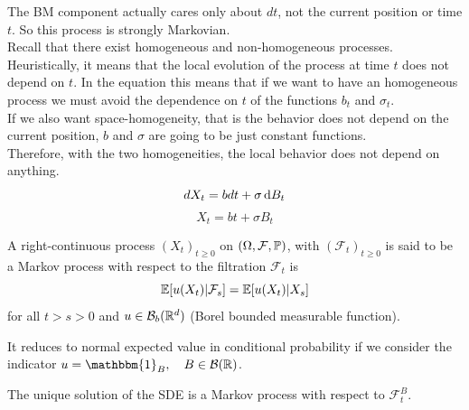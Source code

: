 The BM component actually cares only about $dt$, not the current position or time $t$. So this process is strongly Markovian. \\
Recall that there exist homogeneous and non-homogeneous processes. Heuristically, it means that the local evolution of the process at time $t$ does not depend on $t$. In the equation this means that if we want to have an homogeneous process we must avoid the dependence on $t$ of the functions $b_t$ and $\sigma_t$. \\

If we also want space-homogeneity, that is the behavior does not depend on the current position, $b$ and $\sigma$ are going to be just constant functions. \\
Therefore, with the two homogeneities, the local behavior does not depend on anything. \\
\begin{equation*}
    dX_t = b dt + \sigma \mathop{}\!\mathrm{d} B_t
\end{equation*}
\begin{equation*}
    X_t = bt + \sigma B_t
\end{equation*}
\begin{DefBox}
    \begin{Def}
        A right-continuous process $(X_t)_{t \geq 0}$ on $(\Omega, \mathcal{F}, \mathbb{P})$, with $(\mathcal{F}_t)_{t \geq 0}$ is said to be a Markov process with respect to the filtration $\mathcal{F}_t$ is 
        \begin{equation*}
            \mathbb{E}[u(X_t) | \mathcal{F}_s] = \mathbb{E}[u(X_t)| X_s]
        \end{equation*}
        for all $t > s > 0$ and $u \in \mathcal{B}_b(\mathbb{R}^d)$ (Borel bounded measurable function).
    \end{Def}
\end{DefBox}
It reduces to normal expected value in conditional probability if we consider the indicator $u = \mathbbm{1}_B, \quad B \in \mathcal{B}(\mR)$. 
\begin{ThBox}
    \begin{Th}
        The unique solution of the SDE is a Markov process with respect to $\mathcal{F}_t^B$. 
    \end{Th}
\end{ThBox}
